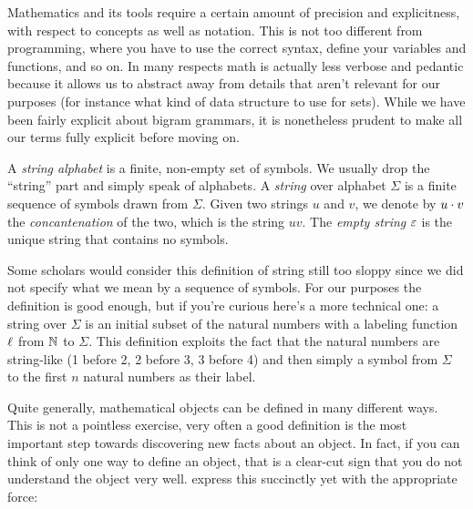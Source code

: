 Mathematics and its tools require a certain amount of precision and explicitness, with respect to concepts as well as notation.
This is not too different from programming, where you have to use the correct syntax, define your variables and functions, and so on.
In many respects math is actually less verbose and pedantic because it allows us to abstract away from details that aren't relevant for our purposes (for instance what kind of data structure to use for sets).
While we have been fairly explicit about bigram grammars, it is nonetheless prudent to make all our terms fully explicit before moving on.

\begin{definition}[Strings]
    A \emph{string alphabet} is a finite, non-empty set of symbols.
    We usually drop the ``string'' part and simply speak of alphabets.
    A \emph{string} over alphabet $\Sigma$ is a finite sequence of symbols drawn from $\Sigma$.
    Given two strings $u$ and $v$, we denote by $u \cdot v$ the \emph{concantenation} of the two, which is the string $uv$.
    The \emph{empty string} $\varepsilon$ is the unique string that contains no symbols.
\end{definition}
%
Some scholars would consider this definition of string still too sloppy since we did not specify what we mean by a sequence of symbols.
For our purposes the definition is good enough, but if you're curious here's a more technical one: a string over $\Sigma$ is an initial subset of the natural numbers with a labeling function $\ell$ from $\mathbb{N}$ to $\Sigma$.
This definition exploits the fact that the natural numbers are string-like (1 before 2, 2 before 3, 3 before 4) and then simply a symbol from $\Sigma$ to the first $n$ natural numbers as their label.

Quite generally, mathematical objects can be defined in many different ways.
This is not a pointless exercise, very often a good definition is the most important step towards discovering new facts about an object.
In fact, if you can think of only one way to define an object, that is a clear-cut sign that you do not understand the object very well.
\citet[10]{KeenanMoss12} express this succinctly yet with the appropriate force:
%
\begin{center}
\end{center}

